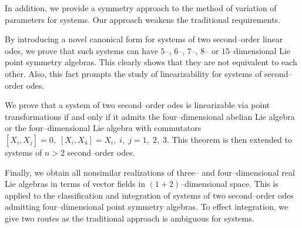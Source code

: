 In addition, we provide a symmetry approach to the method of variation of
parameters for systems. Our approach weakens the traditional requirements. 

By introducing a novel canonical form for systems of two second--order linear
odes, we prove that such systems can have $5$--, $6$--, $7$--, $8$-- or
$15$--dimensional Lie point symmetry algebras. This clearly shows that they
are not equivalent to each other. Also, this fact prompts the study of
linearizability  for systems of second--order odes.

We prove that a system of two second--order odes is linearizable via point
transformations if and only if it admits the four--dimensional abelian Lie
algebra or the four--dimensional Lie algebra with commutators
$[X_i,X_j]=0,\;[X_i,X_4]=X_i,\;i,\;j=1,\;2,\;3$. This theorem is then
extended to systems of $n> 2$ second--order odes.

Finally, we obtain all nonsimilar realizations of three-- and
four--dimensional real Lie algebras in terms of vector fields in
$(1+2)$--dimensional space. This  is applied to the classification and
integration of
systems of two second--order odes admitting four--dimensional point symmetry
algebras. To effect integration, we give two routes as the traditional
approach is ambiguous for systems.

%
